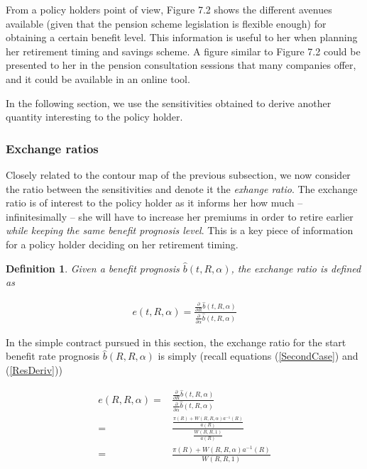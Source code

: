 \documentclass{article}
\newcommand{\1}[1]{\mathbbm{1}_{\left\lbrace #1 \right\rbrace}}
\theoremstyle{break}
\newtheorem{definition}{Definition}[section]
\theoremstyle{remark}
\numberwithin{equation}{section}
\begin{document}
From a policy holders point of view, Figure 7.2 shows the different avenues available (given that the pension scheme legislation is flexible enough) for obtaining a certain benefit level. This information is useful to her when planning her retirement timing and savings scheme. A figure similar to Figure 7.2 could be presented to her in the pension consultation sessions that many companies offer, and it could be available in an online tool.

In the following section, we use the sensitivities obtained to derive another quantity interesting to the policy holder.

\subsubsection{Exchange ratios}

Closely related to the contour map of the previous subsection, we now consider the ratio between the sensitivities and denote it the \textit{exhange ratio}. The exchange ratio is of interest to the policy holder as it informs her how much -- infinitesimally -- she will have to increase her premiums in order to retire earlier \textit{while keeping the same benefit prognosis level}. This is a key piece of information for a policy holder deciding on her retirement timing.

\begin{definition} \label{Exchange}
	Given a benefit prognosis $\hat{b}(t,R,\alpha)$, the exchange ratio is defined as
	
\begin{align*}
	e(t,R,\alpha) = \frac{\frac{\partial}{\partial R }\hat{b}(t,R,\alpha)}{\frac{\partial}{\partial \alpha }\hat{b}(t,R,\alpha)}
\end{align*}
\end{definition}

In the simple contract pursued in this section, the exchange ratio for the start benefit rate prognosis $\hat{b}(R,R,\alpha)$ is simply (recall equations (\ref{SecondCase}) and (\ref{ResDeriv}))

\begin{align*}
	e(R,R,\alpha) =& \frac{\frac{\partial}{\partial R }\hat{b}(t,R,\alpha)}{\frac{\partial}{\partial \alpha }\hat{b}(t,R,\alpha)} \\
	=& \frac{\frac{\pi (R) + W(R,R,\alpha) a^{-1}(R)}{a(R)}}{\frac{W(R,R,1)}{a(R)}} \\
	=& \frac{\pi (R) + W(R,R,\alpha) a^{-1}(R)}{W(R,R,1)}
\end{align*}
\end{document}
